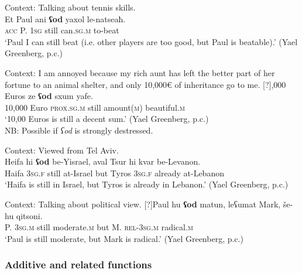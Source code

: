\begin{exe}
	\ex\label{exAppendixHebrewOdMarginal1}
	Context: Talking about tennis skills.\\
	\gll Et Paul ani \textbf{ʕod} yaxol le-natseaħ.\\
	\textsc{acc} P. 1\textsc{sg} still can.\textsc{sg}.\textsc{m} to-beat\\
	\glt \lq Paul I can still beat (i.e. other players are too good, but Paul is beatable).' (Yael Greenberg, p.c.)

	\ex\label{exAppendixHebrewOdMarginal2}
	Context: I am annoyed because my rich aunt has left the better part of her fortune to an animal shelter, and only 10,000€ of inheritance go to me.
	\exi{}[?]{,000 Euros ze \textbf{ʕod} sxum yafe.\\
	10,000 Euro \textsc{prox}.\textsc{sg}.\textsc{m} still amount(\textsc{m}) beautiful.\textsc{m}\\
	\glt \lq{}10,00 Euros is still a decent sum.' (Yael Greenberg, p.c.)\\
	NB: Possible if \textit{ʕod} is strongly destressed.}
	
	\ex\label{exAppendixHebrewOdMarginal3}
	Context: Viewed from Tel Aviv.\\
	\gll Heifa hi \textbf{ʕod} be-Yisrael, aval Tsur hi kvar be-Levanon.\\
	Haifa 3\textsc{sg}.\textsc{f} still at-Israel but Tyros 3\textsc{sg}.\textsc{f} already at-Lebanon\\
	\glt \lq Haifa is still in Israel, but Tyros is already in Lebanon.\rq{ }(Yael Greenberg, p.c.)
	
	\ex\label{exAppendixHebrewOdMarginal4}
	Context: Talking about political view.
	\exi{}[?]{\gll Paul hu \textbf{ʕod} matun, leʕumat Mark, še-hu qitsoni.\\
	P. 3\textsc{sg}.\textsc{m} still moderate.\textsc{m} but M. \textsc{rel}-3\textsc{sg}.\textsc{m} radical.\textsc{m}\\
	\glt \lq Paul is still moderate, but Mark is radical.' (Yael Greenberg, p.c.)}	
\end{exe}	

\subsubsection{Additive and related functions}
